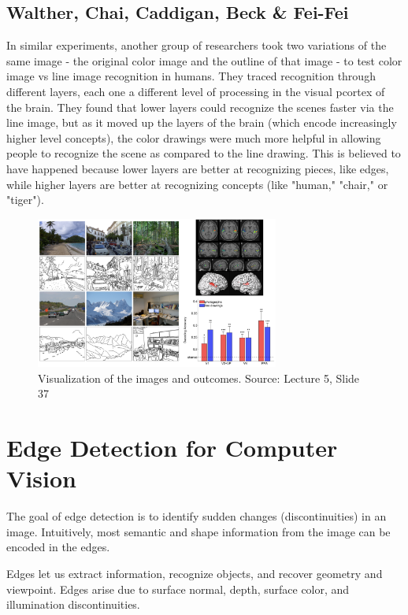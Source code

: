 \documentclass{article}
\begin{document}
\subsection{Walther, Chai, Caddigan, Beck \& Fei-Fei}
In similar experiments, another group of researchers took two variations of the same image - the original color image and the outline of that image - to test color image vs line image recognition in humans. They traced recognition through different layers, each one a different level of processing in the visual pcortex of the brain. They found that lower layers could recognize the scenes faster via the line image, but as it moved up the layers of the brain (which encode increasingly higher level concepts), the color drawings were much more helpful in allowing people to recognize the scene as compared to the line drawing. This is believed to have happened because lower layers are better at recognizing pieces, like edges, while higher layers are better at recognizing concepts (like "human," "chair," or "tiger").

\begin{figure}[H]
\centering
\includegraphics[width=8cm]{fei-fei_images.png}
\caption{Visualization of the images and outcomes. Source: Lecture 5, Slide 37}
\end{figure}


\section{Edge Detection for Computer Vision}
The goal of edge detection is to identify sudden changes (discontinuities) in an image. Intuitively, most semantic and shape information from the image can be encoded in the edges. \newline

Edges let us extract information, recognize objects, and recover geometry and viewpoint. Edges arise due to surface normal, depth, surface color, and illumination discontinuities. \newline
\end{document}
